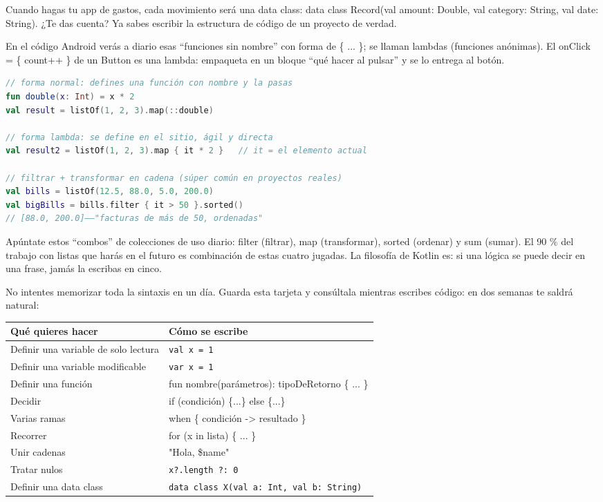 Cuando hagas tu app de gastos, cada movimiento será una data class: data class Record(val amount: Double, val category: String, val date: String). ¿Te das cuenta? Ya sabes escribir la estructura de código de un proyecto de verdad.


En el código Android verás a diario esas “funciones sin nombre” con forma de \{ ... \}; se llaman lambdas (funciones anónimas). El onClick = \{ count++ \} de un Button es una lambda: empaqueta en un bloque “qué hacer al pulsar” y se lo entrega al botón.

\begin{lstlisting}[language=Kotlin]
// forma normal: defines una función con nombre y la pasas
fun double(x: Int) = x * 2
val result = listOf(1, 2, 3).map(::double)

// forma lambda: se define en el sitio, ágil y directa
val result2 = listOf(1, 2, 3).map { it * 2 }   // it = el elemento actual

// filtrar + transformar en cadena (súper común en proyectos reales)
val bills = listOf(12.5, 88.0, 5.0, 200.0)
val bigBills = bills.filter { it > 50 }.sorted()
// [88.0, 200.0]——"facturas de más de 50, ordenadas"
\end{lstlisting}

Apúntate estos “combos” de colecciones de uso diario: filter (filtrar), map (transformar), sorted (ordenar) y sum (sumar). El 90 \% del trabajo con listas que harás en el futuro es combinación de estas cuatro jugadas. La filosofía de Kotlin es: si una lógica se puede decir en una frase, jamás la escribas en cinco.


No intentes memorizar toda la sintaxis en un día. Guarda esta tarjeta y consúltala mientras escribes código: en dos semanas te saldrá natural:

\begin{center}
\begin{tabularx}{\linewidth}{|X|X|}
\hline
\textbf{Qué quieres hacer} & \textbf{Cómo se escribe} \tabularnewline
\hline
Definir una variable de solo lectura & \texttt{val x = 1} \tabularnewline
Definir una variable modificable & \texttt{var x = 1} \tabularnewline
Definir una función & fun nombre(parámetros): tipoDeRetorno \{ ... \} \tabularnewline
Decidir & if (condición) \{...\} else \{...\} \tabularnewline
Varias ramas & when \{ condición -> resultado \} \tabularnewline
Recorrer & for (x in lista) \{ ... \} \tabularnewline
Unir cadenas & "Hola, \$name" \tabularnewline
Tratar nulos & \texttt{x?.\allowbreak length ?: 0} \tabularnewline
Definir una data class & \texttt{data class X(val a: Int, val b: String)} \tabularnewline
\hline
\end{tabularx}
\end{center}

